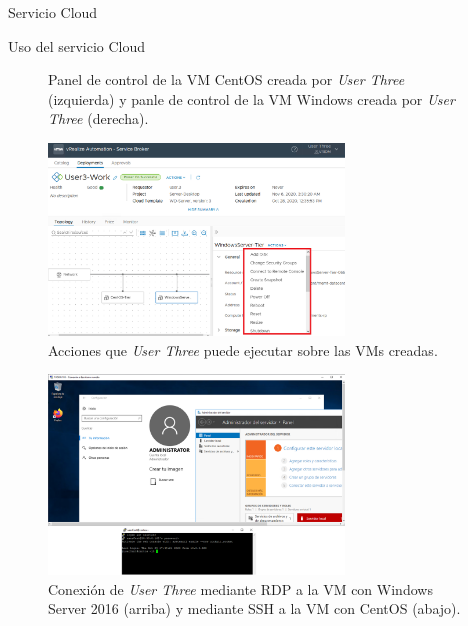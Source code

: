 \begin{subsection}{Servicio Cloud}
\begin{subsubsection}{Uso del servicio Cloud}
\begin{figure}[h]
            \caption{Panel de control de la VM CentOS creada por \textit{User Three} (izquierda) y panle de control de la VM Windows creada por \textit{User Three} (derecha).}
            \label{fig:user3-panel-control}
        \end{figure}
        \FloatBarrier
        \begin{figure}[h]
            \centering
            \includegraphics[width=0.7\textwidth]{imaxes/pruebaconcepto/vrealize/user3-vm-actions.png}
            \caption{Acciones que \textit{User Three} puede ejecutar sobre las VMs creadas.}
            \label{fig:user3-actions}
        \end{figure}
        \FloatBarrier
        \begin{figure}[h]
            \centering
            \includegraphics[width=0.7\textwidth]{imaxes/pruebaconcepto/vrealize/Windows-RDP.png}
            \caption{Conexión de \textit{User Three} mediante RDP a la VM con Windows Server 2016 (arriba) y mediante SSH a la VM con CentOS (abajo).}
            \label{fig:vm-cent-win-connection}
        \end{figure}
        \FloatBarrier

\end{subsubsection}
\end{subsection}
